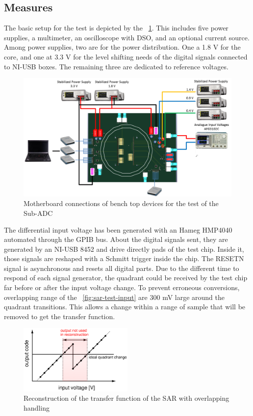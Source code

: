 \subsection{Measures}
The basic setup for the test is depicted by the \figurename~\ref{fig:sar-test-connections}. This includes five power supplies, a multimeter, an oscilloscope with DSO, and an optional current source. Among power supplies, two are for the power distribution. One a 1.8 V for the core, and one at 3.3 V for the level shifting needs of the digital signals connected to NI-USB boxes. The remaining three are dedicated to reference voltages.

\begin{figure}[htp]
    \centering
    \includegraphics[width=.8\textwidth]{Chapter5/Figs/sar_test/board_test_setup.png}
    \caption{Motherboard connections of bench top devices for the test of the Sub-ADC}
    \label{fig:sar-test-connections}
\end{figure}

The differential input voltage has been generated with an Hameg HMP4040 automated through the GPIB bus. About the digital signals sent, they are generated by an NI-USB 8452 and drive directly pads of the test chip. Inside it, those signals are reshaped with a Schmitt trigger inside the chip. The RESETN signal is asynchronous and resets all digital parts. Due to the different time to respond of each signal generator, the quadrant could be received by the test chip far before or after the input voltage change. To prevent erroneous conversions, overlapping range of the \figurename~\ref{fig:sar-test-input} are 300 mV large around the quadrant transitions. This allows a change within a range of sample that will be removed to get the transfer function.

\begin{figure}[htp]
    \centering
    \includegraphics[width=0.5\textwidth]{Chapter5/Figs/sar_test/sar-tf-overlapp.ps}
    \caption{Reconstruction of the transfer function of the SAR with overlapping handling}
    \label{fig:sar-tf-overlap}
\end{figure}

